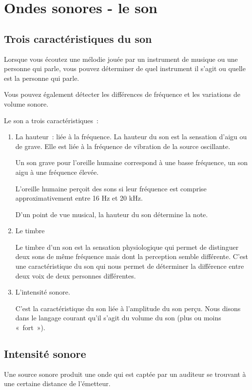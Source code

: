 \section{Ondes sonores - le son }

\subsection{Trois caractéristiques du son}

Lorsque vous écoutez une mélodie jouée par un instrument de musique ou
une personne qui parle, vous pouvez déterminer de quel instrument il
s'agit ou quelle est la personne qui parle.

Vous pouvez également détecter les différences de fréquence et les
variations de volume sonore.

Le son a trois caractéristiques~:
\begin{enumerate}
   \item La hauteur~: liée à la fréquence. 
La hauteur du son est la sensation d'aigu ou de grave. Elle est liée à
la fréquence de vibration de la source oscillante.

Un son grave pour l'oreille humaine correspond à une basse fréquence, un
son aigu à une fréquence élevée.

L'oreille humaine perçoit des sons si leur fréquence est comprise
approximativement entre 16 Hz et 20 kHz.

D'un point de vue musical, la hauteur du son détermine la note.

\item Le timbre

Le timbre d'un son est la sensation physiologique qui permet de
distinguer deux sons de même fréquence mais dont la perception semble
différente. C'est une caractéristique du son qui nous permet de
déterminer la différence entre deux voix de deux personnes différentes.

\item L'intensité sonore.

C'est la caractéristique du son liée à l'amplitude du son perçu. Nous
disons dans le langage courant qu'il s'agit du volume du son (plus ou
moins «~fort~»).
\end{enumerate}

\subsection{Intensité sonore}

Une source sonore produit une onde qui est captée par un auditeur se
trouvant à une certaine distance de l'émetteur.

